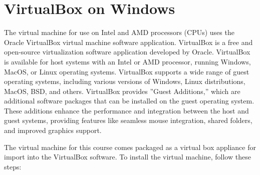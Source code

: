 

\clearpage
\section{VirtualBox on Windows}

The virtual machine for use on Intel and AMD processors (CPUs) uses the Oracle VirtualBox virtual machine software application. VirtualBox is a free and open-source virtualization software application developed by Oracle. VirtualBox is available for host systems with an Intel or AMD processor, running Windows, MacOS, or Linux operating systems. VirtualBox supports a wide range of guest operating systems, including various versions of Windows, Linux distributions, MacOS, BSD, and others. VirtualBox provides ''Guest Additions,'' which are additional software packages that can be installed on the guest operating system. These additions enhance the performance and integration between the host and guest systems, providing features like seamless mouse integration, shared folders, and improved graphics support. 

The virtual machine for this course comes packaged as a virtual box appliance for import into the VirtualBox software. To install the virtual machine, follow these steps:

